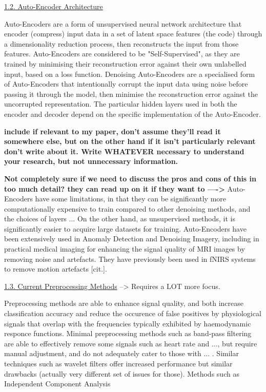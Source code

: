 \documentclass[9pt]{article}
\begin{document}
\ul{1.2. Auto-Encoder Architecture}

Auto-Encoders are a form of unsupervised neural network architecture that encoder (compress) input data in a set of latent space features (the code) through a dimensionality reduction process, then reconstructs the input from those features. Auto-Encoders are considered to be "Self-Supervised", as they are trained by minimising their reconstruction error against their own unlabelled input, based on a loss function. Denoising Auto-Encoders are a specialised form of Auto-Encoders that intentionally corrupt the input data using noise before passing it through the model, then minimise the reconstruction error against the uncorrupted representation. The particular hidden layers used in both the encoder and decoder depend on the specific implementation of the Auto-Encoder.

\textbf{include if relevant to my paper, don't assume they'll read it somewhere else, but on the other hand if it isn't particularly relevant don't write about it. Write WHATEVER necessary to understand your research, but not unnecessary information.}

\textbf {Not completely sure if we need to discuss the pros and cons of this in too much detail? they can read up on it if they want to ----> }
Auto-Encoders have some limitations, in that they can be significantly more computationally expensive to train compared to other denoising methods, and the choices of layers ... On the other hand, as unsupervised methods, it is significantly easier to acquire large datasets for training. Auto-Encoders have been extensively used in Anomaly Detection and Denoising Imagery, including in practical medical imaging for enhancing the signal quality of MRI images by removing noise and artefacts. They have previously been used in fNIRS systems to remove motion artefacts [cit.].  

\ul{1.3. Current Preprocessing Methods} --> Requires a LOT more focus.

Preprocessing methods are able to enhance signal quality, and both increase classification accuracy and reduce the occurence of false positives by physiological signals that overlap with the frequencies typically exhibited by haemodynamic responce functions. Minimal preprocessing methods such as band-pass filtering are able to effectively remove some signals such as heart rate and ..., but require manual adjustment, and do not adequately cater to those with ... . Similar techniques such as wavelet filters offer increased performance but similar drawbacks (actually very different set of issues for those). Methods such as Independent Component Analysis 
\end{document}
